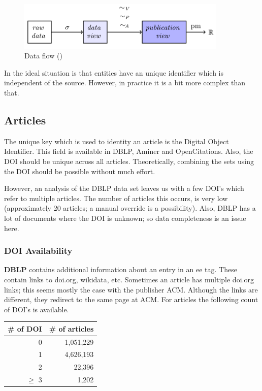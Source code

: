 \documentclass{ou-report}
\newcommand{\doi}{{DOI}}
\begin{document}
\begin{figure}[H]
    \centering
    \includegraphics[width=10cm]{images/data_to_publication_metrics_jm2017.png}
    \caption{Data flow (\cite{JM2017})}
    \label{fig:dataflow_jm2017_b}
\end{figure}

In the ideal situation is that entities have an unique identifier which is 
independent of the source. However, in practice it is a bit more complex than 
that.

\subsection{Articles}
The unique key which is used to identity an article is the Digital Object 
Identifier. This field is available in DBLP, Aminer and OpenCitations. Also, the
\doi{} should be unique across all articles. 
Theoretically, combining the sets using the DOI should be possible without much
effort.

However, an analysis of the DBLP data set leaves us with a few DOI's which refer
to multiple articles. The number of articles this occurs, is very low
(approximately 20 articles; a manual override is a possibility). Also, DBLP 
has a lot of documents where the DOI is unknown; so data completeness 
is an issue here. 

\subsubsection{DOI Availability}
\label{subsec:data_doi_availability}
\textbf{DBLP} contains additional information about an entry in an ee tag. These contain 
links to doi.org, wikidata, etc. Sometimes an article has multiple doi.org links; 
this seems mostly the case with the publisher ACM. Although the links are 
different, they redirect to the same page at ACM.
For articles the following count of DOI's is available.
\begin{center}
    \begin{tabular}{ rr }
        \toprule
        \# of DOI & \# of articles \\
        \midrule
        0 & 1,051,229 \\
        1 & 4,626,193 \\
        2 & 22,396 \\
        $\geq$ 3 & 1,202 \\
        \bottomrule
    \end{tabular}
\end{center}
\end{document}
